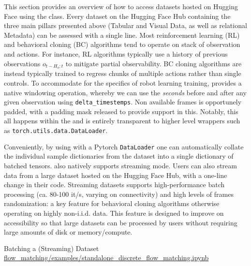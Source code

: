 This section provides an overview of how to access datasets hosted on Hugging Face using the \lerobotdataset class. 
Every dataset on the Hugging Face Hub containing the three main pillars presented above (Tabular and Visual Data, as well as relational Metadata) can be assessed with a single line.
Most reinforcement learning (RL) and behavioral cloning (BC) algorithms tend to operate on stack of observation and actions.
For instance, RL algorithms typically use a history of previous observations \(o_{t-H_o:t} \) to mitigate partial observability.
BC cloning algorithms are instead typically trained to regress chunks of multiple actions rather than single controls.
To accommodate for the specifics of robot learning training, \lerobotdataset provides a native windowing operation, whereby we can use the \emph{seconds} before and after any given observation using \texttt{delta\_timestemps}. 
Non available frames is opportunely padded, with a padding mask released to provide support in this.
Notably, this all happens within the \lerobotdataset and is entirely transparent to higher level wrappers such as \texttt{torch.utils.data.DataLoader}.

Conveniently, by using \lerobotdataset with a Pytorch \texttt{DataLoader} one can automatically collate the individual sample dictionaries from the dataset into a single dictionary of batched tensors.
\lerobotdataset also natively supports streaming mode. 
Users can also stream data from a large dataset hosted on the Hugging Face Hub, with a one-line change in their code.
Streaming datasets supports high-performance batch processing (ca. 80-100 it/s, varying on connectivity) and high levels of frames randomization: a key feature for behavioral cloning algorithms otherwise operating on highly non-i.i.d. data.
This feature is designed to improve on accessibility so that large datasets can be processed by users without requiring large amounts of disk or memory/compute.


\begin{pbox}[label={ex:dataset-batching}]{Batching a (Streaming) Dataset \\ \url{flow_matching/examples/standalone_discrete_flow_matching.ipynb}}
\inputminted{python}{snippets/01_1_datasets.py}
\end{pbox}